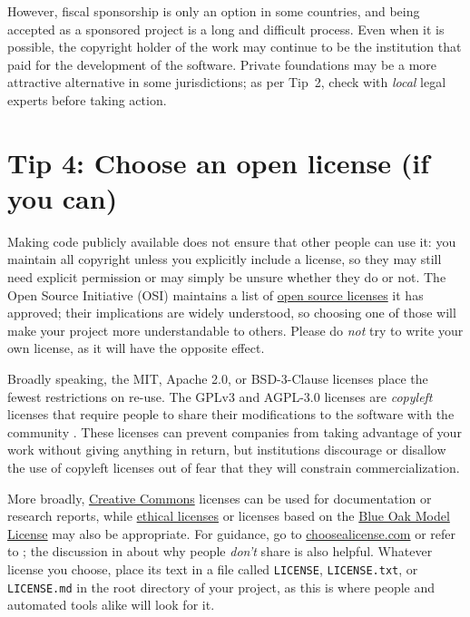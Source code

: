 \documentclass[10pt,letterpaper]{article}
\begin{document}
However,
fiscal sponsorship is only an option in some countries,
and being accepted as a sponsored project is a long and difficult process.
Even when it is possible,
the copyright holder of the work may continue to be the institution that paid for the development of the software.
Private foundations may be a more attractive alternative in some jurisdictions;
as per Tip~2,
check with \emph{local} legal experts before taking action.

\section*{Tip 4: Choose an open license (if you can)}

Making code publicly available does not ensure that other people can use it:
you maintain all copyright unless you explicitly include a license,
so they may still need explicit permission
or may simply be unsure whether they do or not.
The Open Source Initiative (OSI)
maintains a list of \href{https://opensource.org/licenses}{open source licenses} it has approved;
their implications are widely understood,
so choosing one of those will make your project more understandable to others.
Please do \emph{not} try to write your own license,
as it will have the opposite effect.

Broadly speaking,
the MIT, Apache 2.0, or BSD-3-Clause licenses place the fewest restrictions on re-use.
The GPLv3 and AGPL-3.0 licenses are \emph{copyleft} licenses
that require people to share their modifications to the software with the community \cite{Morin2012}.
These licenses can prevent companies from taking advantage of your work without giving anything in return,
but institutions discourage or disallow the use of copyleft licenses
out of fear that they will constrain commercialization.

More broadly,
\href{https://creativecommons.org/}{Creative Commons} licenses can be used for documentation or research reports,
while \href{https://ethicalsource.dev/}{ethical licenses}
or licenses based on the \href{https://blueoakcouncil.org/license/1.0.0}{Blue Oak Model License} may also be appropriate.
For guidance,
go to \href{http://choosealicense.com}{choosealicense.com}
or refer to \cite{Fogel2020,Fortunato2021};
the discussion in \cite{Gomes2022} about why people \emph{don't} share is also helpful.
Whatever license you choose,
place its text in a file called \texttt{LICENSE}, \texttt{LICENSE.txt}, or \texttt{LICENSE.md}
in the root directory of your project,
as this is where people and automated tools alike will look for it.
\end{document}
